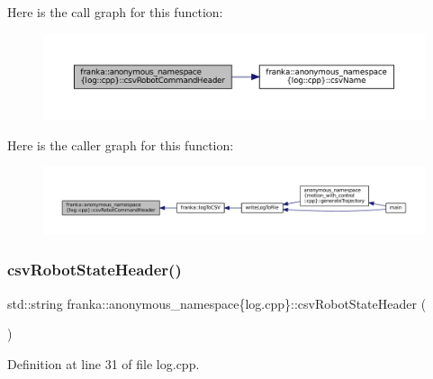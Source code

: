 Here is the call graph for this function\+:
\nopagebreak
\begin{figure}[H]
\begin{center}
\leavevmode
\includegraphics[width=350pt]{namespacefranka_1_1anonymous__namespace_02log_8cpp_03_a2d7829c373ff68580a65cc5a48a2fd32_cgraph}
\end{center}
\end{figure}
Here is the caller graph for this function\+:
\nopagebreak
\begin{figure}[H]
\begin{center}
\leavevmode
\includegraphics[width=350pt]{namespacefranka_1_1anonymous__namespace_02log_8cpp_03_a2d7829c373ff68580a65cc5a48a2fd32_icgraph}
\end{center}
\end{figure}
\mbox{\label{namespacefranka_1_1anonymous__namespace_02log_8cpp_03_a6de657d62964bab6ee389fd7be7b639f}} 
\subsubsection{\texorpdfstring{csv\+Robot\+State\+Header()}{csvRobotStateHeader()}}
{\footnotesize\ttfamily std\+::string franka\+::anonymous\+\_\+namespace\{log.\+cpp\}\+::csv\+Robot\+State\+Header (\begin{DoxyParamCaption}{ }\end{DoxyParamCaption})}



Definition at line 31 of file log.\+cpp.




